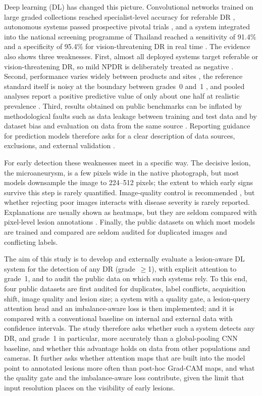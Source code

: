 \documentclass[11pt,a4paper]{article}
\begin{document}
Deep learning (DL) has changed this picture. Convolutional networks trained on large graded collections reached specialist-level accuracy for referable DR \cite{gulshan2016,ting2017}, autonomous systems passed prospective pivotal trials \cite{abramoff2018,ipp2021}, and a system integrated into the national screening programme of Thailand reached a sensitivity of 91.4\% and a specificity of 95.4\% for vision-threatening DR in real time \cite{ruamviboonsuk2022}. The evidence also shows three weaknesses. First, almost all deployed systems target referable or vision-threatening DR, so mild NPDR is deliberately treated as negative \cite{gulshan2016,ipp2021,ruamviboonsuk2022}. Second, performance varies widely between products and sites \cite{lee2021,wang2026}, the reference standard itself is noisy at the boundary between grades~0 and~1 \cite{krause2018}, and pooled analyses report a positive predictive value of only about one half at realistic prevalence \cite{wewetzer2021}. Third, results obtained on public benchmarks can be inflated by methodological faults such as data leakage between training and test data \cite{kapoor2023} and by dataset bias and evaluation on data from the same source \cite{varoquaux2022}. Reporting guidance for prediction models therefore asks for a clear description of data sources, exclusions, and external validation \cite{collins2024}.

For early detection these weaknesses meet in a specific way. The decisive lesion, the microaneurysm, is a few pixels wide in the native photograph, but most models downsample the image to 224--512 pixels; the extent to which early signs survive this step is rarely quantified. Image-quality control is recommended \cite{dai2021,ruamviboonsuk2022}, but whether rejecting poor images interacts with disease severity is rarely reported. Explanations are usually shown as heatmaps, but they are seldom compared with pixel-level lesion annotations \cite{sayres2019}. Finally, the public datasets on which most models are trained and compared are seldom audited for duplicated images and conflicting labels.

The aim of this study is to develop and externally evaluate a lesion-aware DL system for the detection of any DR (grade~$\geq$1), with explicit attention to grade~1, and to audit the public data on which such systems rely. To this end, four public datasets are first audited for duplicates, label conflicts, acquisition shift, image quality and lesion size; a system with a quality gate, a lesion-query attention head and an imbalance-aware loss is then implemented; and it is compared with a conventional baseline on internal and external data with confidence intervals. The study therefore asks whether such a system detects any DR, and grade~1 in particular, more accurately than a global-pooling CNN baseline, and whether this advantage holds on data from other populations and cameras. It further asks whether attention maps that are built into the model point to annotated lesions more often than post-hoc Grad-CAM maps, and what the quality gate and the imbalance-aware loss contribute, given the limit that input resolution places on the visibility of early lesions.
\end{document}
